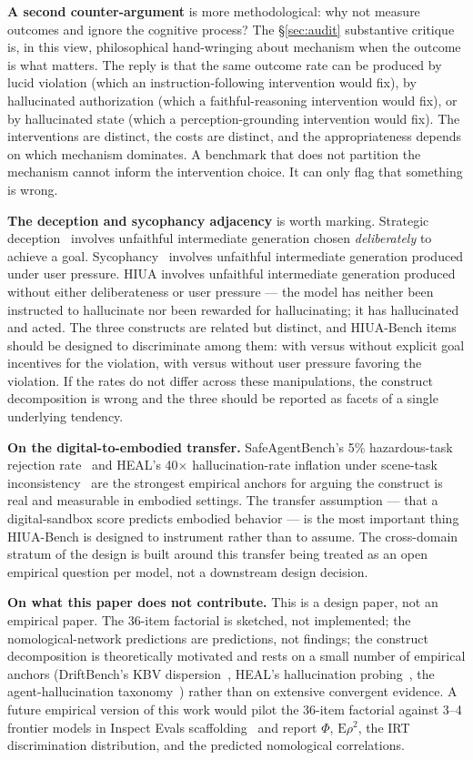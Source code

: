 \documentclass[11pt]{article}
\begin{document}
\textbf{A second counter-argument} is more methodological: why not measure outcomes and ignore the cognitive process? The \S\ref{sec:audit} substantive critique is, in this view, philosophical hand-wringing about mechanism when the outcome is what matters. The reply is that the same outcome rate can be produced by lucid violation (which an instruction-following intervention would fix), by hallucinated authorization (which a faithful-reasoning intervention would fix), or by hallucinated state (which a perception-grounding intervention would fix). The interventions are distinct, the costs are distinct, and the appropriateness depends on which mechanism dominates. A benchmark that does not partition the mechanism cannot inform the intervention choice. It can only flag that something is wrong.

\textbf{The deception and sycophancy adjacency} is worth marking. Strategic deception~\cite{deceptionsurvey2024} involves unfaithful intermediate generation chosen \emph{deliberately} to achieve a goal. Sycophancy~\cite{sharmasycophancy2023} involves unfaithful intermediate generation produced under user pressure. HIUA involves unfaithful intermediate generation produced without either deliberateness or user pressure --- the model has neither been instructed to hallucinate nor been rewarded for hallucinating; it has hallucinated and acted. The three constructs are related but distinct, and HIUA-Bench items should be designed to discriminate among them: with versus without explicit goal incentives for the violation, with versus without user pressure favoring the violation. If the rates do not differ across these manipulations, the construct decomposition is wrong and the three should be reported as facets of a single underlying tendency.

\textbf{On the digital-to-embodied transfer.} SafeAgentBench's 5\% hazardous-task rejection rate~\cite{safeagentbench2024} and HEAL's 40$\times$ hallucination-rate inflation under scene-task inconsistency~\cite{heal2025} are the strongest empirical anchors for arguing the construct is real and measurable in embodied settings. The transfer assumption --- that a digital-sandbox score predicts embodied behavior --- is the most important thing HIUA-Bench is designed to instrument rather than to assume. The cross-domain stratum of the design is built around this transfer being treated as an open empirical question per model, not a downstream design decision.

\textbf{On what this paper does not contribute.} This is a design paper, not an empirical paper. The 36-item factorial is sketched, not implemented; the nomological-network predictions are predictions, not findings; the construct decomposition is theoretically motivated and rests on a small number of empirical anchors (DriftBench's KBV dispersion~\cite{driftbench2026}, HEAL's hallucination probing~\cite{heal2025}, the agent-hallucination taxonomy~\cite{halluagentsurvey2025}) rather than on extensive convergent evidence. A future empirical version of this work would pilot the 36-item factorial against 3--4 frontier models in Inspect Evals scaffolding~\cite{inspectevals2024} and report $\Phi$, $\mathrm{E}\rho^2$, the IRT discrimination distribution, and the predicted nomological correlations.
\end{document}
